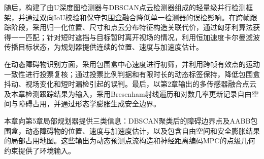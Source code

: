 随后，构建了由U深度图检测器与DBSCAN点云检测器组成的轻量级并行检测框架，并通过双向IoU校验和保守包围盒融合降低单一检测器的误检影响。在跨帧跟踪阶段，采用归一化位置、尺寸和点云分布特征构造关联代价，通过匈牙利算法获得一一匹配；针对短时遮挡与目标暂时离开视场的情况，利用恒加速度卡尔曼滤波传播目标状态，为规划器提供连续的位置、速度与加速度估计。

在动态障碍物识别方面，采用包围盒中心速度进行初筛，并利用跨帧有效点的运动一致性进行投票复核；通过投票比例判据和有限时长的动态标签保持，降低包围盒抖动、视场变化和短时漏检引起的误判。最后，以第2章输出的多传感器融合点云及本章检测跟踪结果为输入，采用Bresenham射线遍历和对数几率更新记录自由空间与障碍占用，并通过形态学膨胀生成安全边界。

本章向第5章局部规划器提供三类信息：DBSCAN聚类后的障碍边界点及AABB包围盒，动态障碍物的位置、速度与加速度估计，以及包含自由空间和安全膨胀结果的局部占用地图。这些输出为动态预测点流构造和神经距离编码MPC的点级几何约束提供了环境输入。
